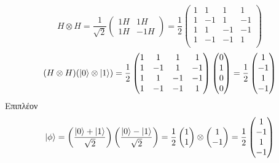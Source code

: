 \documentclass[12pt]{article}
\begin{document}
 \section*{{}}

 $$H \otimes H = \frac{1}{\sqrt{2}} \begin{pmatrix*}
    1H &1H\\
    1H &-1H
\end{pmatrix*} =\frac{1}{2}\begin{pmatrix*}
    1 &1 & 1& 1\\
    1 &-1 & 1&-1 \\
    1 &1 & -1& -1\\
    1 &-1 & -1&1 \\
\end{pmatrix*}  $$ 
$$(H \otimes H ) (\ket{0}\otimes \ket{1})=\frac{1}{2}\begin{pmatrix*}
    1 &1 & 1& 1\\
    1 &-1 & 1&-1 \\
    1 &1 & -1& -1\\
    1 &-1 & -1&1 \\
\end{pmatrix*}  \begin{pmatrix*}
   0\\
   1\\
   0\\
   0\\
\end{pmatrix*} = \frac{1}{2}\begin{pmatrix*}
    1\\
    -1\\
    1\\
    -1\\
 \end{pmatrix*} $$ 
Eπιπλέον 
$$\ket{\phi}= \left(\frac{\ket{0}+\ket{1}}{\sqrt{2}}\right)\left(\frac{\ket{0}-\ket{1}}{\sqrt{2}}\right) = \frac{1}{2}\begin{pmatrix*}
    1\\
    1
 \end{pmatrix*}\otimes\begin{pmatrix*}
    1\\
    -1
 \end{pmatrix*}=\frac{1}{2}\begin{pmatrix*}
    1\\
    -1\\
    1\\
    -1
 \end{pmatrix*}$$
\end{document}
